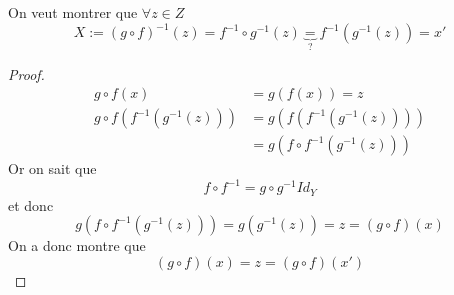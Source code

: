 \documentclass[../main.tex]{subfiles}
\begin{document}
\begin{propo}\label{propo:inverse_d_une_composition}
On veut montrer que $\forall z \in Z$ 
\[ 
	X := ( g\circ f)^{-1} ( z) = f^{-1} \circ g^{-1} ( z) \underbrace{=}_{?} f^{-1} ( g^{-1}(z)) = x'
\]

\end{propo}
\begin{proof}
\begin{align*}
	g \circ f ( x) &= g(f(x)) = z\\
	g\circ f( f^{-1}(g^{-1}(z))) &= g(f(f^{-1}(g^{-1}(z))))\\
				     &= g( f\circ f^{-1}(g^{-1}(z)))
\end{align*}
Or on sait que
\[ 
	f \circ f^{-1} = g \circ g^{-1} Id_{Y}
\]
et donc
\[ 
	g(f\circ f^{-1}(g^{-1}(z))) = g(g^{-1}(z)) =z = ( g \circ f)(x) 
\]
On a donc montre que
\[ 
	(g \circ f)(x) = z = ( g\circ f)(x')
\]

\end{proof}
\end{document}
